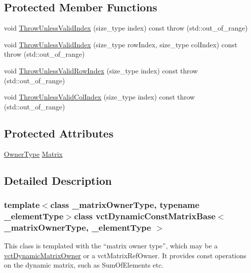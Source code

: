 \subsection*{Protected Member Functions}
\begin{DoxyCompactItemize}
\item 
void \hyperlink{classvct_dynamic_const_matrix_base_a767283d050f4f9d34881ec1af7556f4b}{Throw\-Unless\-Valid\-Index} (size\-\_\-type index) const   throw (std\-::out\-\_\-of\-\_\-range)
\item 
void \hyperlink{classvct_dynamic_const_matrix_base_a89a94602aecdad0d2b33f50925b8f54a}{Throw\-Unless\-Valid\-Index} (size\-\_\-type row\-Index, size\-\_\-type col\-Index) const   throw (std\-::out\-\_\-of\-\_\-range)
\item 
void \hyperlink{classvct_dynamic_const_matrix_base_a3efffdbb50c547a542272f18b43cedd3}{Throw\-Unless\-Valid\-Row\-Index} (size\-\_\-type index) const   throw (std\-::out\-\_\-of\-\_\-range)
\item 
void \hyperlink{classvct_dynamic_const_matrix_base_a2c9f6345316049ee1c7849b2d04fcf68}{Throw\-Unless\-Valid\-Col\-Index} (size\-\_\-type index) const   throw (std\-::out\-\_\-of\-\_\-range)
\end{DoxyCompactItemize}
\subsection*{Protected Attributes}
\begin{DoxyCompactItemize}
\item 
\hyperlink{classvct_dynamic_const_matrix_base_a2e37ebc2ac741d4346d21f986e625e96}{Owner\-Type} \hyperlink{classvct_dynamic_const_matrix_base_a46173996e3b23fd3dec1ff901a56b60c}{Matrix}
\end{DoxyCompactItemize}


\subsection{Detailed Description}
\subsubsection*{template$<$class \-\_\-matrix\-Owner\-Type, typename \-\_\-element\-Type$>$class vct\-Dynamic\-Const\-Matrix\-Base$<$ \-\_\-matrix\-Owner\-Type, \-\_\-element\-Type $>$}

This class is templated with the ``matrix owner type'', which may be a \hyperlink{classvct_dynamic_matrix_owner}{vct\-Dynamic\-Matrix\-Owner} or a vct\-Matrix\-Ref\-Owner. It provides const operations on the dynamic matrix, such as Sum\-Of\-Elements etc.

